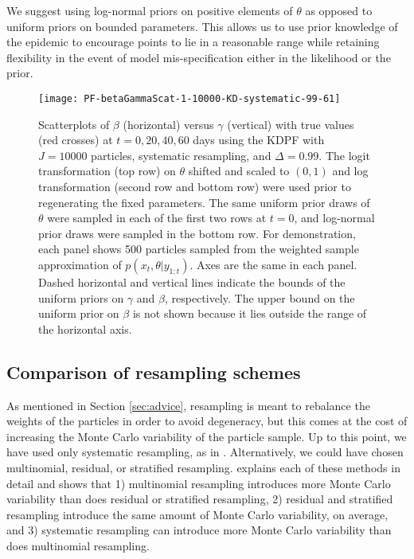 \documentclass{elsarticle}
\begin{document}
We suggest using log-normal priors on positive elements of $\theta$ as opposed to uniform priors on bounded parameters. This allows us to use prior knowledge of the epidemic to encourage points to lie in a reasonable range while retaining flexibility in the event of model mis-specification either in the likelihood or the prior.

\begin{figure}
\centering
\begin{minipage}{1.0\linewidth}
\texttt{[image: PF-betaGammaScat-1-10000-KD-systematic-99-61]}
\caption{Scatterplots of $\beta$ (horizontal) versus $\gamma$ (vertical) with true values (red crosses) at $t = 0, 20, 40, 60$ days using the KDPF with $J = 10000$ particles, systematic resampling, and $\Delta = 0.99$. The logit transformation (top row) on $\theta$ shifted and scaled to $(0,1)$ and log transformation (second row and bottom row) were used prior to regenerating the fixed parameters. The same uniform prior draws of $\theta$ were sampled in each of the first two rows at $t = 0$, and log-normal prior draws were sampled in the bottom row. For demonstration, each panel shows 500 particles sampled from the weighted sample approximation of $p(x_t,\theta|y_{1:t})$. Axes are the same in each panel. Dashed horizontal and vertical lines indicate the bounds of the uniform priors on $\gamma$ and $\beta$, respectively. The upper bound on the uniform prior on $\beta$ is not shown because it lies outside the range of the horizontal axis.} \label{fig:priors}
\end{minipage}
\end{figure}

\subsection{Comparison of resampling schemes \label{sec:resample}}

As mentioned in Section \ref{sec:advice}, resampling is meant to rebalance the weights of the particles in order to avoid degeneracy, but this comes at the cost of increasing the Monte Carlo variability of the particle sample. Up to this point, we have used only systematic resampling, as in \citet{skvortsov2012monitoring}. Alternatively, we could have chosen multinomial, residual, or stratified resampling. \citet{Douc:Capp:Moul:comp:2005} explains each of these methods in detail and shows that 1) multinomial resampling introduces more Monte Carlo variability than does residual or stratified resampling, 2) residual and stratified resampling introduce the same amount of Monte Carlo variability, on average, and 3) systematic resampling can introduce more Monte Carlo variability than does multinomial resampling.
\end{document}
